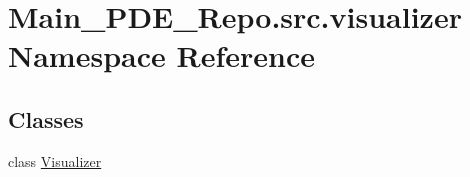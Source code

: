 \hypertarget{namespaceMain__PDE__Repo_1_1src_1_1visualizer}{}\section{Main\+\_\+\+P\+D\+E\+\_\+\+Repo.\+src.\+visualizer Namespace Reference}
\label{namespaceMain__PDE__Repo_1_1src_1_1visualizer}
\subsection*{Classes}
\begin{DoxyCompactItemize}
\item 
class \hyperlink{classMain__PDE__Repo_1_1src_1_1visualizer_1_1Visualizer}{Visualizer}
\end{DoxyCompactItemize}
